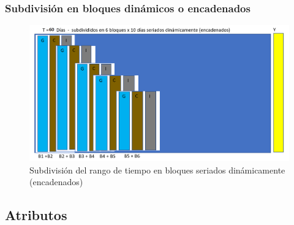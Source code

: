 \documentclass{beamer}
\begin{document}
\begin{frame}
	\frametitle{Subdivisión en bloques dinámicos o encadenados}
	\begin{figure}[H]
		\centering
		\includegraphics[width=0.7\linewidth]{figs/imagen21}
		\caption{Subdivisión del rango de tiempo en bloques seriados dinámicamente (encadenados)}
		\label{fig:imagen321}
	\end{figure}
	
\end{frame}





\subsection{Atributos}
\end{document}
